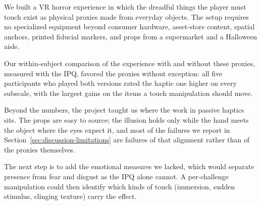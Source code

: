 
We built a VR horror experience in which the dreadful things the player must touch exist as physical proxies made from everyday objects.
The setup requires no specialized equipment beyond consumer hardware, asset-store content, spatial anchors, printed fiducial markers, and props from a supermarket and a Halloween aisle.

Our within-subject comparison of the experience with and without these proxies, measured with the IPQ, favored the proxies without exception: all five participants who played both versions rated the haptic one higher on every subscale, with the largest gains on the items a touch manipulation should move.

Beyond the numbers, the project taught us where the work in passive haptics sits. The props are easy to source; the illusion holds only while the hand meets the object where the eyes expect it, and most of the failures we report in Section~\ref{sec:discussion-limitations} are failures of that alignment rather than of the proxies themselves.

The next step is to add the emotional measures we lacked, which would separate presence from fear and disgust as the IPQ alone cannot. A per-challenge manipulation could then identify which kinds of touch (immersion, sudden stimulus, clinging texture) carry the effect.
